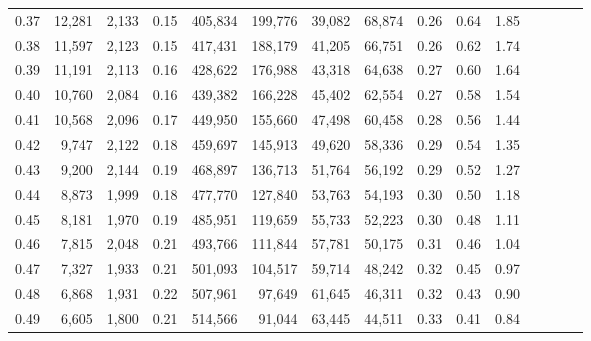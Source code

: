 \begin{tabular}{rrrcrrrrrrrrrrr}
0.37 &  12,281 &  2,133 &                                       0.15 &  405,834 &  199,776 &   39,082 &   68,874 &  0.26 &  0.64 &                         1.85 \\
0.38 &  11,597 &  2,123 &                                       0.15 &  417,431 &  188,179 &   41,205 &   66,751 &  0.26 &  0.62 &                         1.74 \\
0.39 &  11,191 &  2,113 &                                       0.16 &  428,622 &  176,988 &   43,318 &   64,638 &  0.27 &  0.60 &                         1.64 \\
0.40 &  10,760 &  2,084 &                                       0.16 &  439,382 &  166,228 &   45,402 &   62,554 &  0.27 &  0.58 &                         1.54 \\
0.41 &  10,568 &  2,096 &                                       0.17 &  449,950 &  155,660 &   47,498 &   60,458 &  0.28 &  0.56 &                         1.44 \\
0.42 &   9,747 &  2,122 &                                       0.18 &  459,697 &  145,913 &   49,620 &   58,336 &  0.29 &  0.54 &                         1.35 \\
0.43 &   9,200 &  2,144 &                                       0.19 &  468,897 &  136,713 &   51,764 &   56,192 &  0.29 &  0.52 &                         1.27 \\
0.44 &   8,873 &  1,999 &                                       0.18 &  477,770 &  127,840 &   53,763 &   54,193 &  0.30 &  0.50 &                         1.18 \\
0.45 &   8,181 &  1,970 &                                       0.19 &  485,951 &  119,659 &   55,733 &   52,223 &  0.30 &  0.48 &                         1.11 \\
0.46 &   7,815 &  2,048 &                                       0.21 &  493,766 &  111,844 &   57,781 &   50,175 &  0.31 &  0.46 &                         1.04 \\
0.47 &   7,327 &  1,933 &                                       0.21 &  501,093 &  104,517 &   59,714 &   48,242 &  0.32 &  0.45 &                         0.97 \\
0.48 &   6,868 &  1,931 &                                       0.22 &  507,961 &   97,649 &   61,645 &   46,311 &  0.32 &  0.43 &                         0.90 \\
0.49 &   6,605 &  1,800 &                                       0.21 &  514,566 &   91,044 &   63,445 &   44,511 &  0.33 &  0.41 &                         0.84 \\

\end{tabular}
